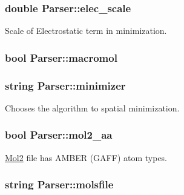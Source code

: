 \hypertarget{classParser_a848002312e9561eca6d4d6ebcf9c0138}{
\subsubsection[{elec\_\-scale}]{\setlength{\rightskip}{0pt plus 5cm}double {\bf Parser::elec\_\-scale}}}
\label{classParser_a848002312e9561eca6d4d6ebcf9c0138}


Scale of Electrostatic term in minimization. 

\hypertarget{classParser_a126f993711c0fbbb87b6789f169c8aa0}{
\subsubsection[{macromol}]{\setlength{\rightskip}{0pt plus 5cm}bool {\bf Parser::macromol}}}
\label{classParser_a126f993711c0fbbb87b6789f169c8aa0}
\hypertarget{classParser_ad13db04a963874a5cdfcc21b74e157c8}{
\subsubsection[{minimizer}]{\setlength{\rightskip}{0pt plus 5cm}string {\bf Parser::minimizer}}}
\label{classParser_ad13db04a963874a5cdfcc21b74e157c8}


Chooses the algorithm to spatial minimization. 

\hypertarget{classParser_a8db5c5682da4ecd746f4e73594955b09}{
\subsubsection[{mol2\_\-aa}]{\setlength{\rightskip}{0pt plus 5cm}bool {\bf Parser::mol2\_\-aa}}}
\label{classParser_a8db5c5682da4ecd746f4e73594955b09}


\hyperlink{classMol2}{Mol2} file has AMBER (GAFF) atom types. 

\hypertarget{classParser_aabdbf6e55bcc06654dac165f6b5bc427}{
\subsubsection[{molsfile}]{\setlength{\rightskip}{0pt plus 5cm}string {\bf Parser::molsfile}}}
\label{classParser_aabdbf6e55bcc06654dac165f6b5bc427}


